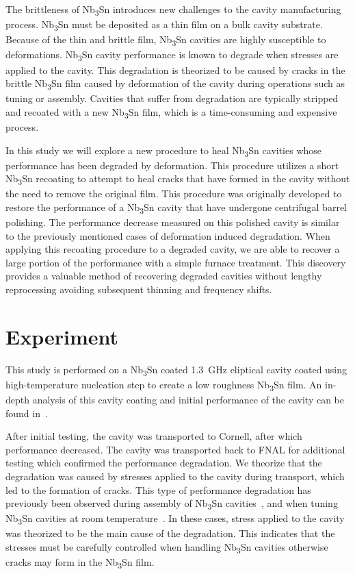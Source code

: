 \documentclass{revtex4-2}
\begin{document}
The brittleness of Nb\textsubscript{3}Sn introduces new challenges to the cavity manufacturing process. Nb\textsubscript{3}Sn must be deposited as a thin film on a bulk cavity substrate.\cite{posen2017nb3sn, pudasaini2019growth, porter2018update} Because of the thin and brittle film, Nb\textsubscript{3}Sn cavities are highly susceptible to deformations. Nb\textsubscript{3}Sn cavity performance is known to degrade when stresses are applied to the cavity.\cite{eremeev2023preservation, eremeev:srf2019-mop015} This degradation is theorized to be caused by cracks in the brittle Nb\textsubscript{3}Sn film caused by deformation of the cavity during operations such as tuning or assembly. Cavities that suffer from degradation are typically stripped and recoated with a new Nb\textsubscript{3}Sn film, which is a time-consuming and expensive process.

In this study we will explore a new procedure to heal Nb\textsubscript{3}Sn cavities whose performance has been degraded by deformation. This procedure utilizes a short Nb\textsubscript{3}Sn recoating to attempt to heal cracks that have formed in the cavity without the need to remove the original film. This procedure was originally developed to restore the performance of a Nb\textsubscript{3}Sn cavity that have undergone centrifugal barrel polishing\cite{viklund2024improving}. The performance decrease measured on this polished cavity is similar to the previously mentioned cases of deformation induced degradation. When applying this recoating procedure to a degraded cavity, we are able to recover a large portion of the performance with a simple furnace treatment. This discovery provides a valuable method of recovering degraded cavities without lengthy reprocessing avoiding subsequent thinning and frequency shifts.


\section{Experiment}
\label{sec:Experiment}

This study is performed on a Nb\textsubscript{3}Sn coated \qty{1.3}{\giga\hertz} eliptical cavity coated using high-temperature nucleation step to create a low roughness Nb\textsubscript{3}Sn film. An in-depth analysis of this cavity coating and initial performance of the cavity can be found in~\cite{posen2021advances}. 

After initial testing, the cavity was transported to Cornell, after which performance decreased. The cavity was transported back to FNAL for additional testing which confirmed the performance degradation. We theorize that the degradation was caused by stresses applied to the cavity during transport, which led to the formation of cracks. This type of performance degradation has previously been observed during assembly of Nb\textsubscript{3}Sn cavities~\cite{eremeev2023preservation}, and when tuning Nb\textsubscript{3}Sn cavities at room temperature~\cite{eremeev:srf2019-mop015}. In these cases, stress applied to the cavity was theorized to be the main cause of the degradation. This indicates that the stresses must be carefully controlled when handling Nb\textsubscript{3}Sn cavities otherwise cracks may form in the Nb\textsubscript{3}Sn film.
\end{document}
